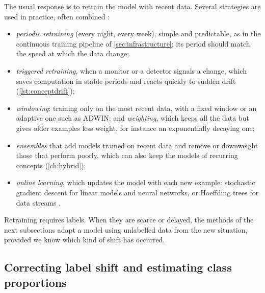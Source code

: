 The usual response is to retrain the model with recent data. Several strategies are used in practice, often
combined \citep{gama2014survey,lu2019learning}:
\begin{itemize}
  \item \emph{periodic retraining} (every night, every week), simple and predictable, as in the continuous training
        pipeline of \cref{sec:infrastructure}; its period should match the speed at which the data change;
  \item \emph{triggered retraining}, when a monitor or a detector signals a change, which saves computation in
        stable periods and reacts quickly to sudden drift (\cref{lst:conceptdrift});
  \item \emph{windowing}: training only on the most recent data, with a fixed window or an adaptive one such as
        ADWIN; and \emph{weighting}, which keeps all the data but gives older examples less weight, for instance an
        exponentially decaying one;
  \item \emph{ensembles} that add models trained on recent data and remove or downweight those that perform poorly,
        which can also keep the models of recurring concepts (\cref{ch:hybrid});
  \item \emph{online learning}, which updates the model with each new example: stochastic gradient descent for
        linear models and neural networks, or Hoeffding trees for data streams \citep{domingos2000mining}.
\end{itemize}
Retraining requires labels. When they are scarce or delayed, the methods of the next subsections adapt a model using
unlabelled data from the new situation, provided we know which kind of shift has occurred.

\subsection{Correcting label shift and estimating class proportions\extsec}\label{sec:labelshift}

